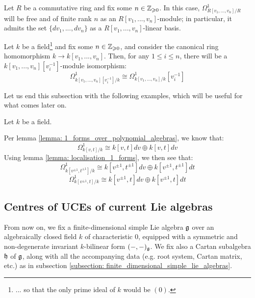         \begin{lemma} \label{lemma: 1_forms_over_polynomial_algebras}
            \cite[\href{https://stacks.math.columbia.edu/tag/00RX}{Tag 00RX}]{stacks} Let $R$ be a commutative ring and fix some $n \in \mathbb{Z}_{\geqslant 0}$. In this case, $\Omega^1_{R[v_1, ..., v_n]/R}$ will be free and of finite rank $n$ as an $R[v_1, ..., v_n]$-module; in particular, it admits the set $\{dv_1, ..., dv_n\}$ as a $R[v_1, ..., v_n]$-linear basis.
        \end{lemma}
        \begin{lemma} \label{lemma: localisation_1_forms}
            \cite[\href{https://stacks.math.columbia.edu/tag/031G}{Tag 031G}]{stacks} Let $k$ be a field\footnote{... so that the only prime ideal of $k$ would be $(0)$.} and fix some $n \in \mathbb{Z}_{\geqslant 0}$, and consider the canonical ring homomorphism $k \to k[v_1, ..., v_n]$. Then, for any $1 \leq i \leq n$, there will be a $k[v_1, ..., v_n][v_i^{-1}]$-module isomorphism:
                $$\Omega^1_{k[v_1, ..., v_n][v_i^{-1}]/k} \cong \Omega^1_{k[v_1, ..., v_n]/k}[v_i^{-1}]$$
        \end{lemma}

        Let us end this subsection with the following examples, which will be useful for what comes later on.
        \begin{example}
            Let $k$ be a field.
        
            Per lemma \ref{lemma: 1_forms_over_polynomial_algebras}, we know that:
                $$\Omega^1_{k[v, t]/k} \cong k[v, t] dv \oplus k[v, t] dv$$
            Using lemma \ref{lemma: localisation_1_forms}, we then see that:
                $$\Omega^1_{k[v^{\pm 1}, t^{\pm 1}]/k} \cong k[v^{\pm 1}, t^{\pm 1}] dv \oplus k[v^{\pm 1}, t^{\pm 1}] dt$$
                $$\Omega^1_{k[v^{\pm 1}, t]/k} \cong k[v^{\pm 1}, t] dv \oplus k[v^{\pm 1}, t] dt$$
        \end{example}

    \subsection{Centres of UCEs of current Lie algebras}
        \begin{convention} \label{conv: a_fixed_finite_dimensional_simple_lie_algebra}
            From now on, we fix a finite-dimensional simple Lie algebra $\mathfrak{g}$ over an algebraically closed field $k$ of characteristic $0$, equipped with a symmetric and non-degenerate invariant $k$-bilinear form $(-, -)_{\mathfrak{g}}$. We fix also a Cartan subalgebra $\mathfrak{h}$ of $\mathfrak{g}$, along with all the accompanying data (e.g. root system, Cartan matrix, etc.) as in subsection \ref{subsection: finite_dimensional_simple_lie_algebras}. 
        \end{convention}

